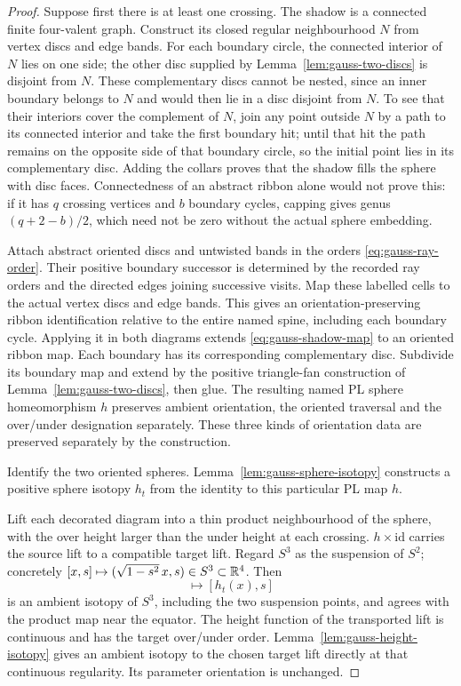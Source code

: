 \begin{proof}
Suppose first there is at least one crossing. The shadow is a connected
finite four-valent graph. Construct its closed regular neighbourhood $N$
from vertex discs and edge bands. For each boundary circle, the connected
interior of $N$ lies on one side; the other disc supplied by
Lemma~\ref{lem:gauss-two-discs} is disjoint from $N$.
These complementary discs cannot be nested, since an inner boundary belongs
to $N$ and would then lie in a disc disjoint from $N$. To see that their
interiors cover the complement of $N$, join any point outside $N$ by a path
to its connected interior and take the first boundary hit; until that hit
the path remains on the opposite side of that boundary circle, so the
initial point lies in its complementary disc. Adding the collars proves that the shadow fills the
sphere with disc faces. Connectedness of an abstract ribbon alone would not
prove this: if it has $q$ crossing vertices and $b$ boundary cycles, capping
gives genus $(q+2-b)/2$, which need not be zero without the actual sphere
embedding.

Attach abstract oriented discs and untwisted bands in the orders
\eqref{eq:gauss-ray-order}. Their positive boundary successor is determined by the recorded ray
orders and the directed edges joining successive visits. Map these labelled cells to the
actual vertex discs and edge bands. This gives an orientation-preserving
ribbon identification relative to the entire named spine, including each
boundary cycle. Applying it in both diagrams extends \eqref{eq:gauss-shadow-map}
to an oriented ribbon map. Each boundary has its corresponding complementary
disc. Subdivide its boundary map and extend by the positive triangle-fan
construction of Lemma~\ref{lem:gauss-two-discs}, then glue. The resulting
named PL sphere homeomorphism $h$ preserves ambient
orientation, the oriented traversal and the over/under designation
separately. These three kinds of orientation data are preserved separately by the
construction.

Identify the two oriented spheres. Lemma~\ref{lem:gauss-sphere-isotopy}
constructs a positive sphere isotopy $h_t$ from the identity to this
particular PL map $h$.

Lift each decorated diagram into a thin product neighbourhood of the sphere,
with the over height larger than the under height at each crossing.
$h\times\mathrm{id}$ carries the source lift to a compatible target lift.
Regard $S^3$ as the suspension of $S^2$; concretely
$[x,s]\mapsto(\sqrt{1-s^2}\,x,s)\in S^3\subset\mathbb R^4$.
Then
\begin{equation}
 [x,s]\longmapsto[h_t(x),s]
\end{equation}
is an ambient isotopy of $S^3$, including the two suspension points, and
agrees with the product map near the equator. The height function of the
transported lift is continuous and has the target over/under order.
Lemma~\ref{lem:gauss-height-isotopy} gives an ambient isotopy to the chosen
target lift directly at that continuous regularity. Its parameter
orientation is unchanged.


\end{proof}
